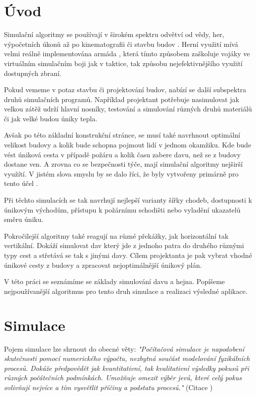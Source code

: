\documentclass[czech,public,dept460,male,cpdeclaration]{diploma}
\begin{document}
\MakeTitlePages

\lstlistoflistings

\section{Úvod}
Simulační algoritmy se používají v širokém spektru odvětví od vědy, her, výpočetních úkonů až po kinematografii či stavbu budov \cite{linkToBuildingSimulation}. Herní využití mívá velmi reálně implementována armáda \cite{linkToArmySimulation}, která tímto způsobem zaškoluje vojáky ve virtuálním simulačním boji jak v taktice, tak způsobu nejefektivnějšího využití dostupných zbraní. 

Pokud vememe v potaz stavbu či projektování budov, nabízí se další subspektra  druhů simulačních programů. Například projektant potřebuje nasimulovat jak velkou zátěž udrží hlavní nosníky, testování a simulování různých druhů materiálů či jak velké budou úniky tepla.

Avšak po této základní konstrukční stránce, se musí také navrhnout optimální velikost budovy a kolik bude schopna pojmout lidí v jednom okamžiku. Kde bude vést úniková cesta v případě požáru a kolik času zabere davu, než se z budovy dostane ven. A zrovna co se bezpečnosti týče, mají simulační algoritmy nejširší využítí. V jistém slova smyslu by se dalo říci, že byly vytvořeny primárně pro tento účel \cite{link1}.

Při těchto simulacích se tak navrhují nejlepší varianty šířky chodeb, dostupnosti k únikovým východům, přístupu k požárnímu schodišti nebo vyladění ukazatelů směru
úniku.

Pokročilejší algoritmy také reagují na různé překážky, jak horizontální tak vertikální. Dokáží simulovat dav který jde z jednoho patra do druhého různými typy cest a střetává se tak s jinými davy. Cílem projektanta je pak vybrat vhodné únikové cesty z budovy a zpracovat nejoptimálnější únikový plán.

V této práci se seznámíme se základy simulování davu a hejna. Popíšeme nejpoužívanější algoritmus \cite{link2} pro tento druh simulace a realizaci výsledné aplikace.

\section{Simulace}
Pojem simulace lze shrnout do obecné věty: \textit{"Počítačová simulace je napodobení skutečnosti pomocí numerického výpočtu, nezbytná součást modelování fyzikálních procesů. Dokáže předpovědět jak kvantitativní, tak kvalitativní výsledky pokusů při různých počátečních podmínkách. Umožňuje omezit výběr jevů, které celý pokus ovlivňují nejvíce a tím vysvětlit příčiny a podstatu procesů."} (Citace \cite{linkToSimulation})
\end{document}

